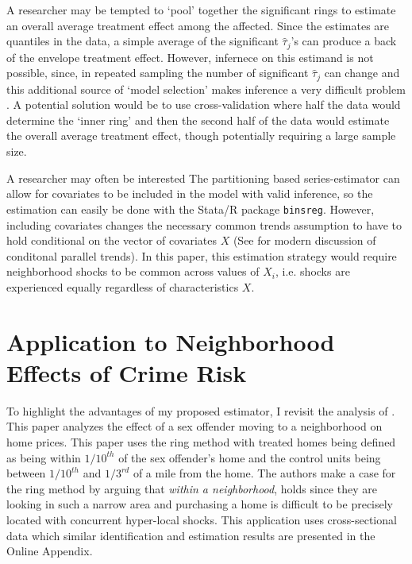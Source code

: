 \documentclass[12pt]{article}
\begin{document}
\begin{remark}
A researcher may be tempted to `pool' together the significant rings to estimate an overall average treatment effect among the affected. Since the estimates are quantiles in the data, a simple average of the significant $\hat{\tau}_j$'s can produce a back of the envelope treatment effect. However, infernece on this estimand is not possible, since, in repeated sampling the number of significant $\hat{\tau}_j$ can change and this additional source of `model selection' makes inference a very difficult problem \citep{Leeb_Potscher_2005}. A potential solution would be to use cross-validation where half the data would determine the `inner ring' and then the second half of the data would estimate the overall average treatment effect, though potentially requiring a large sample size.
\end{remark}

\begin{remark}[Covariates]
A researcher may often be interested The partitioning based series-estimator can allow for covariates to be included in the model with valid inference, so the estimation can easily be done with the Stata/R package \texttt{binsreg}. However, including covariates changes the necessary common trends assumption to have to hold conditional on the vector of covariates $X$ (See \citet{SantAnna_Zhao_2020} for modern discussion of conditonal parallel trends). In this paper, this estimation strategy would require neighborhood shocks to be common across values of $X_i$, i.e. shocks are experienced equally regardless of characteristics $X$.
\end{remark}



\section{Application to Neighborhood Effects of Crime Risk}

To highlight the advantages of my proposed estimator, I revisit the analysis of \citet{Linden_Rockoff_2008}. This paper analyzes the effect of a sex offender moving to a neighborhood on home prices. This paper uses the ring method with treated homes being defined as being within $1/10^{th}$ of the sex offender's home and the control units being between $1/10^{th}$ and $1/3^{rd}$ of a mile from the home. The authors make a case for the ring method by arguing that \emph{within a neighborhood},  holds since they are looking in such a narrow area and purchasing a home is difficult to be precisely located with concurrent hyper-local shocks. This application uses cross-sectional data which similar identification and estimation results are presented in the Online Appendix.
\end{document}
